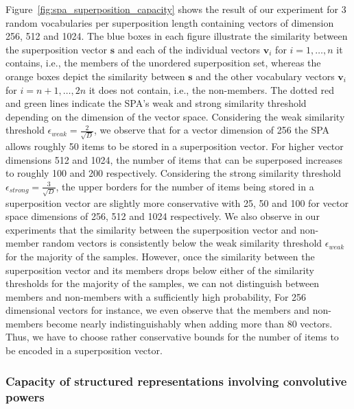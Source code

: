 Figure~\ref{fig:spa_superposition_capacity} shows the result of our experiment for \num{3} random vocabularies per superposition length containing vectors of dimension \num{256}, \num{512} and \num{1024}.
The blue boxes in each figure illustrate the similarity between the superposition vector $ \mathbf{s}$ and each of the individual vectors $ \mathbf{v}_i$ for $i=1, \ldots, n$ it contains, i.e., the members of the unordered superposition set, whereas the orange boxes depict the similarity between $ \mathbf{s}$ and the other vocabulary vectors $ \mathbf{v}_i$ for $i=n+1, \ldots, 2n$ it does not contain, i.e., the non-members.
The dotted red and green lines indicate the \ac{SPA}'s weak and strong similarity threshold depending on the dimension of the vector space.
Considering the weak similarity threshold $\epsilon_{weak} = \tfrac{2}{\sqrt{D}}$, we observe that for a vector dimension of \num{256} the \ac{SPA} allows roughly \num{50} items to be stored in a superposition vector.
For higher vector dimensions \num{512} and \num{1024}, the number of items that can be superposed increases to roughly \num{100} and \num{200} respectively.
Considering the strong similarity threshold $\epsilon_{strong} = \tfrac{3}{\sqrt{D}}$, the upper borders for the number of items being stored in a superposition vector are slightly more conservative with \num{25}, \num{50} and \num{100} for vector space dimensions of \num{256}, \num{512} and \num{1024} respectively.
We also observe in our experiments that the similarity between the superposition vector and non-member random vectors is consistently below the weak similarity threshold $\epsilon_{weak}$ for the majority of the samples.
However, once the similarity between the superposition vector and its members drops below either of the similarity thresholds for the majority of the samples, we can not distinguish between members and non-members with a sufficiently high probability,
For \num{256} dimensional vectors for instance, we even observe that the members and non-members become nearly indistinguishably when adding more than \num{80} vectors.
Thus, we have to choose rather conservative bounds for the number of items to be encoded in a superposition vector.

\subsubsection{Capacity of structured representations involving convolutive powers}%
\label{ssubsec:capacity_of_structured_representations_involving_convolutive_powers}

